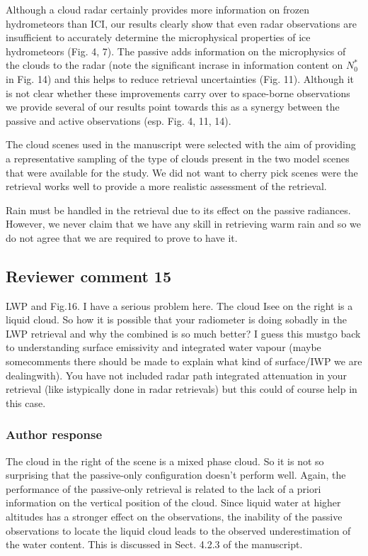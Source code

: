\documentclass[11pt]{scrartcl}
\begin{document}
Although a cloud radar certainly provides more information on frozen
hydrometeors than ICI, our results clearly show that even radar observations are
insufficient to accurately determine the microphysical properties of ice
hydrometeors (Fig. 4, 7). The passive adds information on the microphysics of
the clouds to the radar (note the significant incrase in information content on
$N_0^*$ in Fig. 14) and this helps to reduce retrieval uncertainties (Fig. 11).
Although it is not clear whether these improvements carry over to space-borne
observations we provide several of our results point towards this as a synergy
between the passive and active observations (esp. Fig. 4, 11, 14).

The cloud scenes used in the manuscript were selected with the aim of providing
a representative sampling of the type of clouds present in the two model scenes that
were available for the study. We did not want to cherry pick scenes were the
retrieval works well to provide a more realistic assessment of  the retrieval.


Rain must be handled in the retrieval due to its effect on the passive
radiances. However, we never claim that we have any skill in retrieving warm
rain and so we do not agree that we are required to prove to have it.

\subsection*{Reviewer comment 15}

 LWP and Fig.16.  I have a serious problem here.  The cloud Isee on the right is a liquid cloud. So how it is possible that your radiometer is doing sobadly in the LWP retrieval and why the combined is so much better? I guess this mustgo back to understanding surface emissivity and integrated water vapour (maybe somecomments there should be made to explain what kind of surface/IWP we are dealingwith).  You have not included radar path integrated attenuation in your retrieval (like istypically done in radar retrievals) but this could of course help in this case.

\subsubsection*{Author response}

The cloud in the right of the scene is a mixed phase cloud. So it is not so
surprising that the passive-only configuration doesn't perform well. Again, the
performance of the passive-only retrieval is related to the lack of a priori
information on the vertical position of the cloud. Since liquid water at higher
altitudes has a stronger effect on the observations, the inability of the
passive observations to locate the liquid cloud leads to the observed
underestimation of the water content. This is discussed in Sect. 4.2.3 of the
manuscript.
\end{document}
